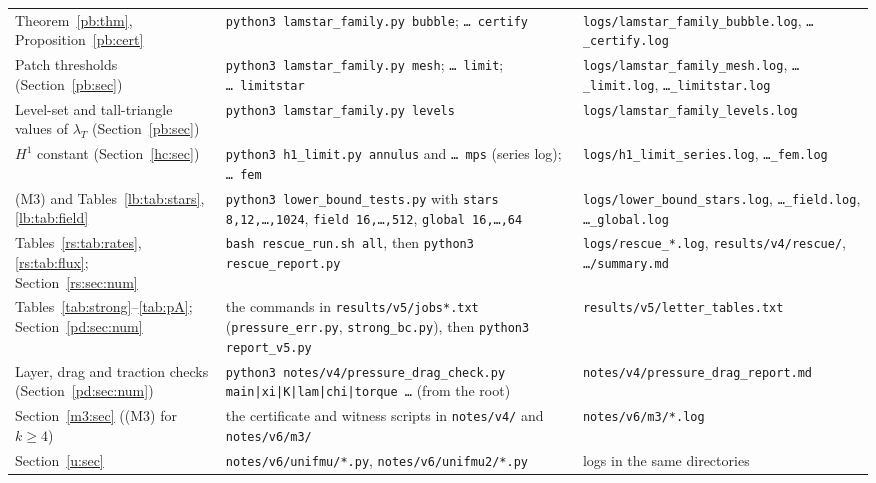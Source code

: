 {\begin{longtable}{>{\raggedright\arraybackslash}p{}>{\raggedright\arraybackslash}p{}>{\raggedright\arraybackslash}p{}}
Theorem~\ref{pb:thm}, Proposition~\ref{pb:cert} & \texttt{python3 lamstar\_family.py bubble}; \texttt{\ldots\ certify} & \texttt{logs/lamstar\_family\_}\allowbreak\texttt{bubble.log}, \texttt{\ldots\_certify.log}\\
Patch thresholds (Section~\ref{pb:sec}) & \texttt{python3 lamstar\_family.py mesh}; \texttt{\ldots\ limit}; \texttt{\ldots\ limitstar} & \texttt{logs/lamstar\_family\_}\allowbreak\texttt{mesh.log}, \texttt{\ldots\_limit.log}, \texttt{\ldots\_limitstar.log}\\
Level-set and tall-triangle values of $\lambda_T$ (Section~\ref{pb:sec}) & \texttt{python3 lamstar\_family.py levels} & \texttt{logs/lamstar\_family\_}\allowbreak\texttt{levels.log}\\
$H^1$ constant (Section~\ref{hc:sec}) & \texttt{python3 h1\_limit.py annulus} and \texttt{\ldots\ mps} (series log); \texttt{\ldots\ fem} & \texttt{logs/h1\_limit\_}\allowbreak\texttt{series.log}, \texttt{\ldots\_fem.log}\\
(M3) and Tables~\ref{lb:tab:stars}, \ref{lb:tab:field} & \texttt{python3 lower\_bound\_tests.py} with \texttt{stars 8,12,\ldots,1024}, \texttt{field 16,\ldots,512}, \texttt{global 16,\ldots,64} & \texttt{logs/lower\_bound\_}\allowbreak\texttt{stars.log}, \texttt{\ldots\_field.log}, \texttt{\ldots\_global.log}\\
Tables~\ref{rs:tab:rates}, \ref{rs:tab:flux}; Section~\ref{rs:sec:num} & \texttt{bash rescue\_run.sh all}, then \texttt{python3 rescue\_report.py} & \texttt{logs/rescue\_*.log}, \texttt{results/v4/}\allowbreak\texttt{rescue/}, \texttt{\ldots/summary.md}\\
Tables~\ref{tab:strong}--\ref{tab:pA}; Section~\ref{pd:sec:num} & the commands in \texttt{results/v5/jobs*.txt} (\texttt{pressure\_err.py}, \texttt{strong\_bc.py}), then \texttt{python3 report\_v5.py} & \texttt{results/v5/}\allowbreak\texttt{letter\_tables.txt}\\
Layer, drag and traction checks (Section~\ref{pd:sec:num}) & \texttt{python3 notes/v4/}\allowbreak\texttt{pressure\_drag\_check.py} \texttt{main|xi|K|lam|chi|torque \ldots} (from the root) & \texttt{notes/v4/}\allowbreak\texttt{pressure\_drag\_report.md}\\
Section~\ref{m3:sec} ((M3) for $k\ge4$) & the certificate and witness scripts in \texttt{notes/v4/} and \texttt{notes/v6/m3/} & \texttt{notes/v6/m3/*.log}\\
Section~\ref{u:sec} & \texttt{notes/v6/unifmu/*.py}, \texttt{notes/v6/unifmu2/*.py} & logs in the same directories\\

\end{longtable}}
